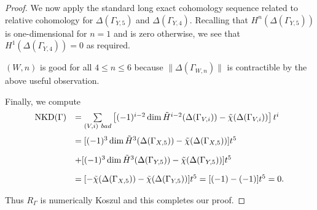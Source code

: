 \documentclass[11pt,righttag]{amsart}
\theoremstyle{definition}
\begin{document}
\begin{proof}
We now apply the standard long exact cohomology sequence related to relative cohomology for $\Delta(\Gamma_{Y, 5})$ and $\Delta(\Gamma_{Y, 4})$. Recalling that $H^n(\Delta(\Gamma_{Y, 5}))$ is one-dimensional for $n = 1$ and is zero otherwise, we see that $H^1(\Delta(\Gamma_{Y, 4})) = 0$ as required. 

$(W, n)$ is good for all $4 \leq n \leq 6$ because $\| \Delta(\Gamma_{W, n}) \|$ is contractible by the above useful observation.

Finally, we compute
$$\begin{array}{ll}
 {{\rm NKD}}(\Gamma) & = \sum\limits_{(V,i)\  bad} \left[ (-1)^{i-2}\dim\tilde H^{i-2} (\Delta(\Gamma_{V,i})) - \tilde\chi(\Delta(\Gamma_{V,i}))\right] t^i \\[15pt]
 & = [(-1)^{3}\dim\tilde H^{3}(\Delta(\Gamma_{X,5}))
- \tilde\chi(\Delta(\Gamma_{X,5})) ] t^5 \\[10pt]
 & + [(-1)^{3}\dim\tilde H^{3}(\Delta(\Gamma_{Y,5}))
- \tilde\chi(\Delta(\Gamma_{Y,5}))] t^5 \\[10pt]
& = [- \tilde\chi(\Delta(\Gamma_{X,5})) - \tilde\chi(\Delta(\Gamma_{Y,5}))]t^5 = [(-1) - (-1)] t^5 = 0.
\end{array} $$

Thus $R_{\Gamma}$ is numerically Koszul and this completes our proof. 
\end{proof}
  



\end{document}
